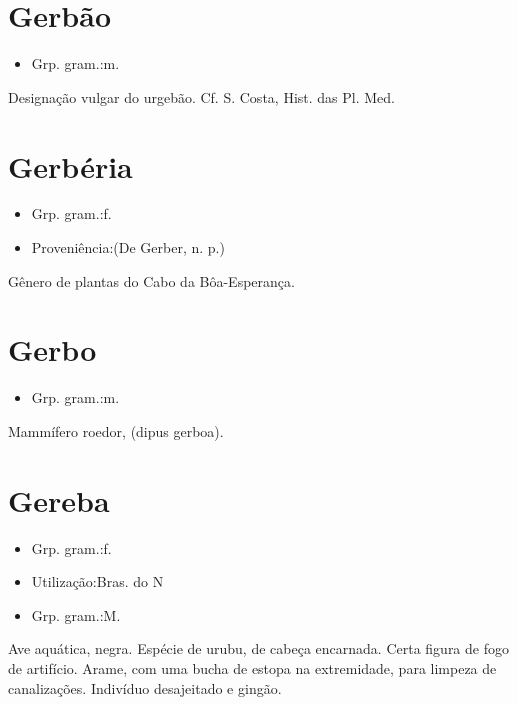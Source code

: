 \section{Gerbão}
\begin{itemize}
\item {Grp. gram.:m.}
\end{itemize}
Designação vulgar do \textunderscore urgebão\textunderscore . Cf. S. Costa, \textunderscore Hist. das Pl. Med.\textunderscore 
\section{Gerbéria}
\begin{itemize}
\item {Grp. gram.:f.}
\end{itemize}
\begin{itemize}
\item {Proveniência:(De \textunderscore Gerber\textunderscore , n. p.)}
\end{itemize}
Gênero de plantas do Cabo da Bôa-Esperança.
\section{Gerbo}
\begin{itemize}
\item {Grp. gram.:m.}
\end{itemize}
Mammífero roedor, (\textunderscore dipus gerboa\textunderscore ).
\section{Gereba}
\begin{itemize}
\item {Grp. gram.:f.}
\end{itemize}
\begin{itemize}
\item {Utilização:Bras. do N}
\end{itemize}
\begin{itemize}
\item {Grp. gram.:M.}
\end{itemize}
Ave aquática, negra.
Espécie de urubu, de cabeça encarnada.
Certa figura de fogo de artifício.
Arame, com uma bucha de estopa na extremidade, para limpeza de canalizações.
Indivíduo desajeitado e gingão.
